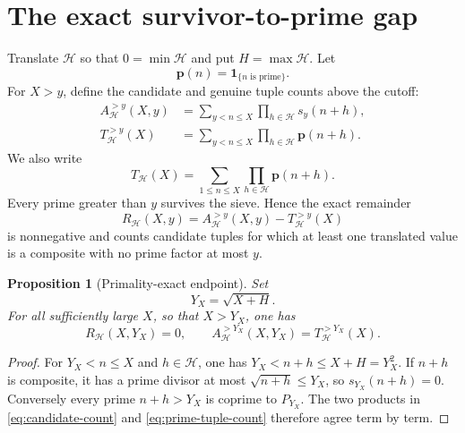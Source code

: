 \documentclass[11pt]{article}
\newtheorem{proposition}[theorem]{Proposition}
\theoremstyle{definition}
\theoremstyle{remark}
\newcommand{\cH}{\mathcal H}
\newcommand{\one}{\mathbf 1}
\begin{document}
\section{The exact survivor-to-prime gap}\label{sec:bridge}

Translate $\cH$ so that $0=\min\cH$ and put $H=\max\cH$.  Let
\begin{equation}\label{eq:prime-indicator}
    \mathbf p(n)=\one_{\{n\text{ is prime}\}}.
\end{equation}
For $X>y$, define the candidate and genuine tuple counts above the cutoff:
\begin{align}
 A_{\cH}^{>y}(X,y)
   &=\sum_{y<n\le X}\prod_{h\in\cH}s_y(n+h),
       \label{eq:candidate-count}\\
 T_{\cH}^{>y}(X)
   &=\sum_{y<n\le X}\prod_{h\in\cH}\mathbf p(n+h).
       \label{eq:prime-tuple-count}
\end{align}
We also write
\begin{equation}\label{eq:full-prime-tuple-count}
    T_{\cH}(X)=\sum_{1\le n\le X}
       \prod_{h\in\cH}\mathbf p(n+h).
\end{equation}
Every prime greater than $y$ survives the sieve.  Hence the exact remainder
\begin{equation}\label{eq:remainder-definition}
    R_{\cH}(X,y)
    =A_{\cH}^{>y}(X,y)-T_{\cH}^{>y}(X)
\end{equation}
is nonnegative and counts candidate tuples for which at least one translated value is a composite with no prime factor at most $y$.

\begin{proposition}[Primality-exact endpoint]\label{prop:exact-endpoint}
Set
\begin{equation}\label{eq:critical-cutoff}
    Y_X=\sqrt{X+H}.
\end{equation}
For all sufficiently large $X$, so that $X>Y_X$, one has
\begin{equation}\label{eq:endpoint-exact}
    R_{\cH}(X,Y_X)=0,
    \qquad
    A_{\cH}^{>Y_X}(X,Y_X)=T_{\cH}^{>Y_X}(X).
\end{equation}
\end{proposition}

\begin{proof}
For $Y_X<n\le X$ and $h\in\cH$, one has
$Y_X<n+h\le X+H=Y_X^2$.  If $n+h$ is composite, it has a prime divisor at most $\sqrt{n+h}\le Y_X$, so $s_{Y_X}(n+h)=0$.  Conversely every prime $n+h>Y_X$ is coprime to $P_{Y_X}$.  The two products in \eqref{eq:candidate-count} and \eqref{eq:prime-tuple-count} therefore agree term by term.
\end{proof}
\end{document}
